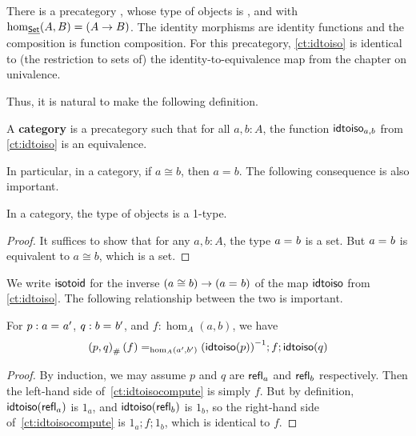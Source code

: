 \begin{eg}\label{ct:precatset}
  There is a precategory \uset, whose type of objects is \set, and with $\hom_{\uset}(A,B) = (A\to B)$.  The identity morphisms are identity functions and the composition is function composition.  For this precategory, \autoref{ct:idtoiso} is identical to (the restriction to sets of) the identity-to-equivalence map from the chapter on univalence.
\end{eg}

Thus, it is natural to make the following definition.

\begin{defn}\label{ct:category}
  A \textbf{category} is a precategory such that for all $a,b:A$, the function $\idtoiso_{a,b}$ from \autoref{ct:idtoiso} is an equivalence.
\end{defn}

In particular, in a category, if $a\cong b$, then $a=b$.  The following consequence is also important.

\begin{lem}\label{ct:obj-1type}
  In a category, the type of objects is a 1-type.
\end{lem}
\begin{proof}
  It suffices to show that for any $a,b:A$, the type $\id a b$ is a set.  But $\id a b$ is equivalent to $a \cong b$, which is a set.
\end{proof}

We write $\isotoid$ for the inverse $(a\cong b) \to (\id a b)$ of the map $\idtoiso$ from \autoref{ct:idtoiso}.  The following relationship between the two is important.

\begin{lem}\label{ct:idtoiso-trans}
  For $p:\id a a'$, $q:\id b b'$, and $f:\hom_A(a,b)$, we have
  \begin{equation}\label{ct:idtoisocompute}
    \id[\hom_A(a',b')]{\trans{(p,q)}{f}}
    {\inv{(\idtoiso(p))};f;\idtoiso(q)}
  \end{equation}
\end{lem}
\begin{proof}
  By induction, we may assume $p$ and $q$ are $\refl a$ and $\refl b$ respectively.  Then the left-hand side of~\eqref{ct:idtoisocompute} is simply $f$.
  But by definition, $\idtoiso(\refl a)$ is $1_a$, and $\idtoiso(\refl b)$ is $1_b$, so the right-hand side of~\eqref{ct:idtoisocompute} is $1_a;f;1_b$, which is identical to $f$.
\end{proof}

